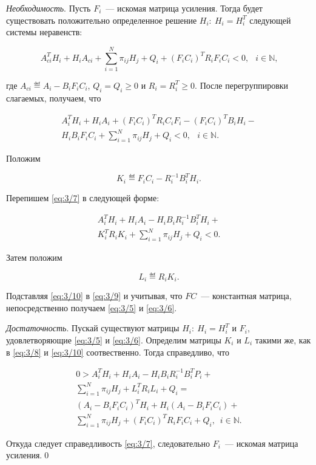 \emph{Необходимость}.
Пусть $F_i$~--- искомая матрица усиления. Тогда будет существовать\cite{KM} положительно определенное решение $H_i\colon~H_i = H_i^T$ следующей системы неравенств:

$$
A_{ci}^TH_i + H_iA_{ci} + \sum\limits_{i=1}^N\pi_{ij}H_j + Q_i + (F_iC_i)^TR_iF_iC_i < 0\mbox{,}~~~~i \in \mathbb{N}\mbox{,}
$$

где $A_{ci} \eqdef A_i - B_iF_iC_i$, $Q_i = Q_i \geqslant 0$ и $R_i = R_i^T \geqslant 0$. После перегруппировки слагаемых, получаем, что

\begin{eqnarray}
\label{eq:3/7}
A_i^TH_i + H_iA_i + (F_iC_i)^TR_iC_iF_i - (F_iC_i)^TB_iH_i - \nonumber \\
H_iB_iF_iC_i + \sum\limits_{i=1}^N\pi_{ij}H_j + Q_i < 0\mbox{,}~~~~i \in \mathbb{N}\mbox{.}
\end{eqnarray}

Положим

\begin{equation}
\label{eq:3/8}
K_i \eqdef F_iC_i - R_i^{-1}B^T_iH_i\mbox{.}
\end{equation}

Перепишем \vref{eq:3/7} в следующей форме:

\begin{eqnarray}
\label{eq:3/9}
A_i^TH_i + H_iA_i - H_iB_iR_i^{-1}B_i^TH_i + \nonumber \\
K_i^TR_iK_i + \sum\limits_{i=1}^N\pi_{ij}H_j + Q_i < 0\mbox{.}
\end{eqnarray}

Затем положим

\begin{equation}
\label{eq:3/10}
L_i \eqdef R_iK_i\mbox{.}
\end{equation}

Подставляя \vref{eq:3/10} в \vref{eq:3/9} и учитывая, что $FC$~--- константная матрица, непосредственно получаем \vref{eq:3/5} и \vref{eq:3/6}.\br

\emph{Достаточность}.
Пускай существуют матрицы $H_i\colon~H_i = H_i^T$ и $F_i$, удовлетворяющие \vref{eq:3/5} и \vref{eq:3/6}. Определим матрицы $K_i$ и $L_i$ такими же, как  в \vref{eq:3/8} и \vref{eq:3/10} соотвественно. Тогда справедливо, что

\begin{eqnarray}
\label{eq:3/11}
0 > A_i^TH_i + H_iA_i - H_iB_iR_i^{-1}B_i^TP_i + \nonumber \\
\sum\limits_{i=1}^N\pi_{ij}H_j + L_i^TR_iL_i + Q_i = \nonumber \\
(A_i - B_iF_iC_i)^TH_i + H_i(A_i - B_iF_iC_i) + \nonumber \\
\sum\limits_{i=1}^N\pi_{ij}H_j + (F_iC_i)^TR_iF_iC_i + Q_i\mbox{,}~~~i \in \mathbb{N}\mbox{.}
\end{eqnarray}

Откуда следует справедливость \vref{eq:3/7}, следовательно $F_i$~--- искомая матрица усиления.\qed\br
